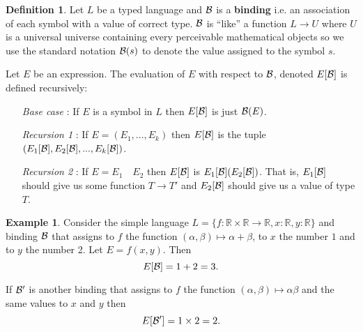 \documentclass{amsart}
\theoremstyle{definition}
\newtheorem{defn}{Definition}
\newtheorem*{example}{Example}
\newcommand{\term}[1]{\textbf{#1}}
\newcommand{\R}{\mathbb{R}}
\begin{document}
\begin{defn}
Let $L$ be a typed language and $\mathcal{B}$ is a \term{binding} i.e. an association of each symbol with a value of correct type. $\mathcal{B}$ is ``like'' a function $L \rightarrow U$ where $U$ is a universal universe containing every perceivable mathematical objects so we use the standard notation $\mathcal{B}(s)$ to denote the value assigned to the symbol $s$.

Let $E$ be an expression. The evaluation of $E$ with respect to $\mathcal{B}$, denoted $E[\mathcal{B}]$ is defined recursively:
\begin{itemize}
\item [{\it Base case}]: If $E$ is a symbol in $L$ then $E[\mathcal{B}]$ is just $\mathcal{B}(E)$.

\item [{\it Recursion 1}]: If $E = (E_1, ..., E_k)$ then $E[\mathcal{B}]$ is the tuple $(E_1[\mathcal{B}], E_2[\mathcal{B}], ..., E_k[\mathcal{B}])$.

\item [{\it Recursion 2}]: If $E = E_1 \quad E_2$ then $E[\mathcal{B}]$ is $E_1[\mathcal{B}](E_2[\mathcal{B}])$. That is, $E_1[\mathcal{B}]$ should give us some function $T \rightarrow T'$ and $E_2[\mathcal{B}]$ should give us a value of type $T$.
\end{itemize}
\end{defn}

\begin{example}
Consider the simple language $L = \{f : \R \times \R \rightarrow \R, x : \R, y : \R\}$ and binding $\mathcal{B}$ that assigns to $f$ the function $(\alpha, \beta) \mapsto \alpha + \beta$, to $x$ the number $1$ and to $y$ the number 2. Let $E = f(x, y)$. Then
$$E[\mathcal{B}] = 1 + 2 = 3.$$

If $\mathcal{B}'$ is another binding that assigns to $f$ the function $(\alpha, \beta) \mapsto \alpha \beta$ and the same values to $x$ and $y$ then
$$E[\mathcal{B}'] = 1 \times 2 = 2.$$
\end{example}
\end{document}
